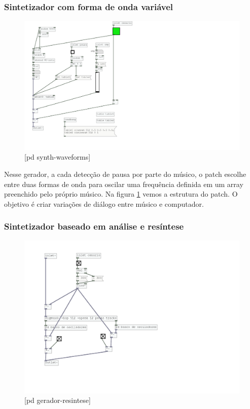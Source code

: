 \documentclass[draft]{ppgmus}
\begin{document}
\subsubsection{Sintetizador com forma de onda variável}

\begin{figure}
\includegraphics[scale=.6]{gerador-sintese-waveform}
\caption{[pd synth-waveforms]}
\label{geradorwaveform}
\end{figure}


Nesse gerador, a cada detecção de pausa por parte do músico, o 
patch escolhe entre duas formas de onda para oscilar uma frequência 
definida em um array preenchido pelo próprio músico. Na figura
\ref{geradorwaveform} vemos a estrutura do patch. O objetivo
é criar variações de diálogo entre músico e computador.



\subsubsection{Sintetizador baseado em análise e resíntese}

\begin{figure}
\includegraphics[scale=.6]{gerador-resintese}
\caption{[pd gerador-resintese]}
\label{geradorresintese}
\end{figure}
\end{document}

